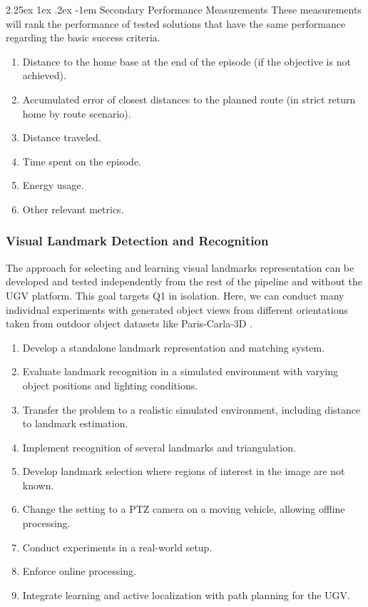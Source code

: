 \documentclass[runningheads]{llncs}
\makeatletter
\renewcommand\paragraph{\@startsection{paragraph}{4}{\z@}%
                                    {2.25ex \@plus1ex \@minus.2ex}%
                                    {-1em}%
                                    {\normalfont\normalsize\bfseries}}
\makeatother
\begin{document}
\paragraph{Secondary Performance Measurements}
These measurements will rank the performance of tested solutions that have the same performance regarding the basic success criteria.
\begin{enumerate}
    \item Distance to the home base at the end of the episode (if the objective is not achieved).
    \item Accumulated error of closest distances to the planned route (in strict return home by route scenario).
    \item Distance traveled.
    \item Time spent on the episode.
    \item Energy usage.
    \item Other relevant metrics.
\end{enumerate}

\subsubsection{Visual Landmark Detection and Recognition}

The approach for selecting and learning visual landmarks representation can be developed and tested independently from the rest of the pipeline and without the UGV platform. This goal targets Q1 in isolation. Here, we can conduct many individual experiments with generated object views from different orientations taken from outdoor object datasets like Paris-Carla-3D \cite{ParisCarla3D}.

\begin{enumerate}
    \item Develop a standalone landmark representation and matching system.
    \item Evaluate landmark recognition in a simulated environment with varying object positions and lighting conditions.
    \item Transfer the problem to a realistic simulated environment, including distance to landmark estimation.
    \item Implement recognition of several landmarks and triangulation.
    \item Develop landmark selection where regions of interest in the image are not known.
    \item Change the setting to a PTZ camera on a moving vehicle, allowing offline processing.
    \item Conduct experiments in a real-world setup.
    \item Enforce online processing.
    \item Integrate learning and active localization with path planning for the UGV.
\end{enumerate}
\end{document}
